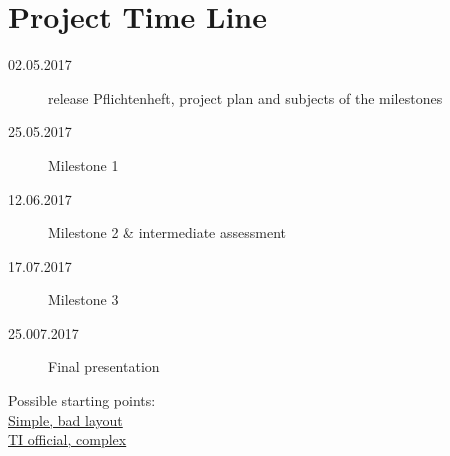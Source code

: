 \section{Project Time Line}

\begin{description}
  \item[02.05.2017] release Pflichtenheft, project plan and subjects of the milestones
  \item[25.05.2017] Milestone 1
  \item[12.06.2017] Milestone 2 \& intermediate assessment
  \item[17.07.2017] Milestone 3
  \item[25.007.2017] Final presentation
\end{description}

Possible starting points: \\
\href{https://bitbucket.org/StylingAndroid/bluetoothle/src/1fe191cf34f34f9917b1d0d62c617c607fe3df4d/src/main/java/com/stylingandroid/ble/?at=Part2}{Simple, bad layout} \\
\href{https://git.ti.com/sensortag-20-android/sensortag-20-android/trees/master/sensortag20/BleSensorTag/src/main/java/com/example/ti}{TI official, complex}
